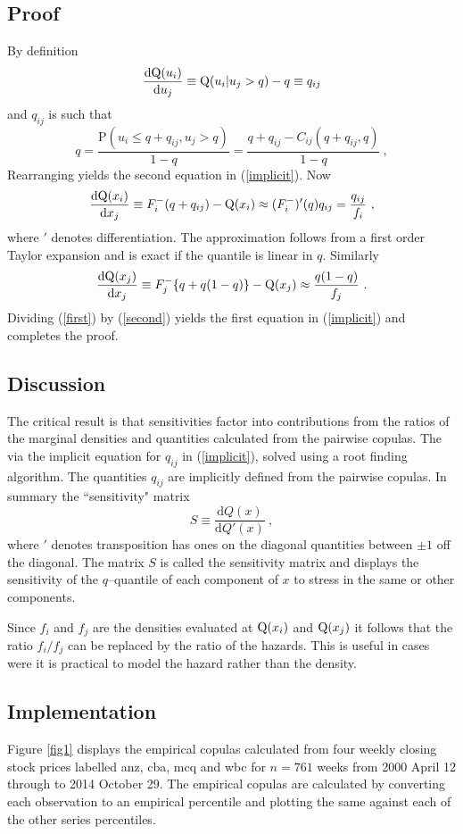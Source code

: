 \documentclass[authoryear]{elsarticle}
\newcommand{\be}{\begin{equation}}
\newcommand{\ee}{\end{equation}}
\newcommand{\de}{\mathrm{d}}
\newcommand{\eref}[1]{(\ref{#1})}
\newcommand{\fref}[1]{Figure \ref{#1}}
\renewcommand{\P}{\mathrm{P}}
\begin{document}
\subsection{Proof}

By definition
$$
\frac{\de\q(u_i)}{\de u_j} \equiv \q(u_i|u_j>q) -q \equiv q_{ij}
$$
and  $q_{ij}$ is such that
\be\label{Qdef}
q =  \frac{\P(u_i\le  q+q_{ij},u_j>q)}{1-q}  = \frac{ q+q_{ij}-C_{ij}(q+q_{ij},q)}{1-q}\ ,
\ee
Rearranging yields the second equation in \eref{implicit}.
Now
 \be\label{first}
 \frac{\de\q(x_i)}{\de x_j}\equiv F_i^-(q+q_{ij}) - \q(x_i) \approx (F_i^-)'(q)q_{ij}= \frac{q_{ij}}{f_i} \ ,
 \ee
where $'$ denotes differentiation.  The approximation follows from a first order Taylor expansion and is exact if the quantile is linear in $q$.   Similarly
 \be\label{second}
 \frac{\de\q(x_j)}{\de x_j}\equiv  F_j^-\{q+q(1-q)\} - \q(x_j)\approx \frac{q(1-q)}{f_j}\ .
 \ee
 Dividing \eref{first} by \eref{second} yields the first equation in  \eref{implicit} and completes the proof.

\subsection{Discussion}  The critical  result is that sensitivities factor into contributions from the ratios of the marginal densities and quantities calculated from the pairwise copulas.  The via  the implicit  equation for $q_{ij}$ in \eref{implicit}, solved using a  root finding algorithm.
  The quantities $q_{ij}$ are implicitly defined from the pairwise copulas. In summary the ``sensitivity" matrix 
$$
S \equiv \frac{\de Q(x)}{\de Q'(x)}\ ,
$$
where $'$ denotes transposition has ones on the diagonal quantities between $\pm 1$ off the diagonal.   The matrix $S$ is called the sensitivity matrix and displays the sensitivity of the $q$--quantile of  each component of $x$ to  stress in the same or other components.  

Since $f_i$ and $f_j$ are  the densities evaluated at $\mathrm{Q}(x_i)$ and $\mathrm{Q}(x_j)$  it follows that the ratio $f_i/f_j$ can be replaced by the ratio of the hazards.   This is  useful in cases were it is practical to model the hazard rather than the density.


\subsection{Implementation}

\fref{fig1} displays the empirical copulas calculated from four weekly closing stock prices labelled anz, cba, mcq and  wbc for $n=761$ weeks from 2000 April 12 through to 2014 October 29.  The empirical copulas are calculated by converting each observation to an empirical percentile and plotting the same against each of the other series percentiles.  
\end{document}
